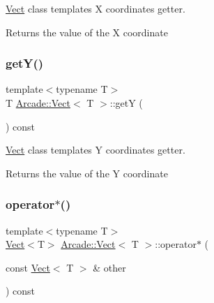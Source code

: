 \hyperlink{class_arcade_1_1_vect}{Vect} class template\textquotesingle{}s X coordinate\textquotesingle{}s getter. 

\begin{DoxyReturn}{Returns}
the value of the X coordinate 
\end{DoxyReturn}
\mbox{\label{class_arcade_1_1_vect_a7d8b8821d45ff6faa5164f8cbccb0875}} 
\subsubsection{\texorpdfstring{get\+Y()}{getY()}}
{\footnotesize\ttfamily template$<$typename T$>$ \\
T \hyperlink{class_arcade_1_1_vect}{Arcade\+::\+Vect}$<$ T $>$\+::getY (\begin{DoxyParamCaption}{ }\end{DoxyParamCaption}) const\hspace{0.3cm}{\ttfamily [inline]}}



\hyperlink{class_arcade_1_1_vect}{Vect} class template\textquotesingle{}s Y coordinate\textquotesingle{}s getter. 

\begin{DoxyReturn}{Returns}
the value of the Y coordinate 
\end{DoxyReturn}
\mbox{\label{class_arcade_1_1_vect_a81ec17a7c29e37edb411397070b71db2}} 
\subsubsection{\texorpdfstring{operator$\ast$()}{operator*()}\hspace{0.1cm}{\footnotesize\ttfamily [1/2]}}
{\footnotesize\ttfamily template$<$typename T$>$ \\
\hyperlink{class_arcade_1_1_vect}{Vect}$<$T$>$ \hyperlink{class_arcade_1_1_vect}{Arcade\+::\+Vect}$<$ T $>$\+::operator$\ast$ (\begin{DoxyParamCaption}\item[{const \hyperlink{class_arcade_1_1_vect}{Vect}$<$ T $>$ \&}]{other }\end{DoxyParamCaption}) const\hspace{0.3cm}{\ttfamily [inline]}}

